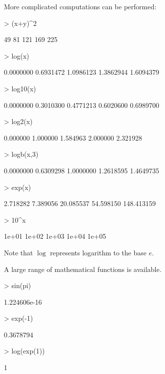\documentclass[12pt,A4,makeidx]{article}
\begin{document}
More complicated computations can be performed:
\begin{Schunk}
\begin{Sinput}
> (x+y)^2 
\end{Sinput}
\begin{Soutput}
[1]  49  81 121 169 225
\end{Soutput}
\begin{Sinput}
> log(x)
\end{Sinput}
\begin{Soutput}
[1] 0.0000000 0.6931472 1.0986123 1.3862944 1.6094379
\end{Soutput}
\begin{Sinput}
> log10(x)
\end{Sinput}
\begin{Soutput}
[1] 0.0000000 0.3010300 0.4771213 0.6020600 0.6989700
\end{Soutput}
\begin{Sinput}
> log2(x)
\end{Sinput}
\begin{Soutput}
[1] 0.000000 1.000000 1.584963 2.000000 2.321928
\end{Soutput}
\begin{Sinput}
> logb(x,3)
\end{Sinput}
\begin{Soutput}
[1] 0.0000000 0.6309298 1.0000000 1.2618595 1.4649735
\end{Soutput}
\begin{Sinput}
> exp(x)
\end{Sinput}
\begin{Soutput}
[1]   2.718282   7.389056  20.085537  54.598150 148.413159
\end{Soutput}
\begin{Sinput}
> 10^x
\end{Sinput}
\begin{Soutput}
[1] 1e+01 1e+02 1e+03 1e+04 1e+05
\end{Soutput}
\end{Schunk}

Note that $\log$ represents logarithm to the base $e$. 

A large range of mathematical functions is available.
\begin{Schunk}
\begin{Sinput}
> sin(pi)
\end{Sinput}
\begin{Soutput}
[1] 1.224606e-16
\end{Soutput}
\begin{Sinput}
> exp(-1)
\end{Sinput}
\begin{Soutput}
[1] 0.3678794
\end{Soutput}
\begin{Sinput}
> log(exp(1))
\end{Sinput}
\begin{Soutput}
[1] 1
\end{Soutput}
\end{Schunk}
\end{document}
